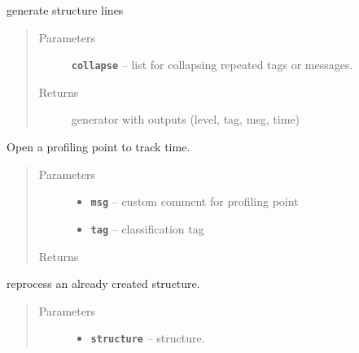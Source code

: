 \documentclass[letterpaper,10pt,english]{sphinxmanual}
\begin{document}
\begin{fulllineitems}
\begin{fulllineitems}
\label{RRtoolbox.lib:RRtoolbox.lib.root.Profiler.lines_unformatted}
generate structure lines
\begin{quote}\begin{description}
\item[{Parameters}] \leavevmode
\textbf{\texttt{collapse}} -- list for collapsing repeated tags or messages.

\item[{Returns}] \leavevmode
generator with outputs (level, tag, msg, time)

\end{description}\end{quote}

\end{fulllineitems}


\begin{fulllineitems}
\label{RRtoolbox.lib:RRtoolbox.lib.root.Profiler.open_point}
Open a profiling point to track time.
\begin{quote}\begin{description}
\item[{Parameters}] \leavevmode\begin{itemize}
\item {} 
\textbf{\texttt{msg}} -- custom comment for profiling point

\item {} 
\textbf{\texttt{tag}} -- classification tag

\end{itemize}

\item[{Returns}] \leavevmode


\end{description}\end{quote}

\end{fulllineitems}


\begin{fulllineitems}
\label{RRtoolbox.lib:RRtoolbox.lib.root.Profiler.restructure}
reprocess an already created structure.
\begin{quote}\begin{description}
\item[{Parameters}] \leavevmode\begin{itemize}
\item {} 
\textbf{\texttt{structure}} -- structure.


\end{itemize}
\end{description}
\end{quote}
\end{fulllineitems}
\end{fulllineitems}
\end{document}
